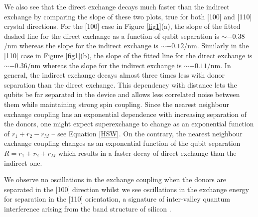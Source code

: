 \documentclass[%
showkeys,
 amsmath,amssymb,
 aps,
prb,
]{revtex4-2}
\begin{document}
We also see that the direct exchange decays much faster than the indirect exchange by comparing the slope of these two plots, true for both [100] and [110] crystal directions. For the [100] case in Figure \ref{fig1}(a), the slope of the fitted dashed line for the direct exchange as a function of qubit separation is $\sim-0.38$/nm  whereas the slope for the indirect exchange is $\sim-0.12$/nm. Similarly in the [110] case in Figure \ref{fig1}(b), the slope of the fitted line for the direct exchange is $\sim-0.36$/nm whereas the slope for the indirect exchange is $\sim-0.11$/nm. In general, the indirect exchange decays almost three times less with donor separation than the direct exchange. This dependency with distance lets the qubits be far separated in the device and allows less correlated noise between them while maintaining strong spin coupling. Since the nearest neighbour exchange coupling has an exponential dependence with increasing separation of the donors, one might expect superexchange to change as an exponential function of $r_1+r_2-r_M$ -- see Equation \ref{HSW}. On the contrary, the nearest neighbour exchange coupling changes as an exponential function of the qubit separation $R=r_1+r_2+r_M$ which results in a faster decay of direct exchange than the indirect one. 

We observe no oscillations in the exchange coupling when the donors are separated in the [100] direction whilst we see oscillations in the exchange energy for separation in the [110] orientation, a signature of inter-valley quantum interference arising from the band structure of silicon \cite{tankasalaShallowDopantPairs2022b,wangHighlyTunableExchange2016a,koillerExchangeSiliconbasedQuantum2001}.
\end{document}
